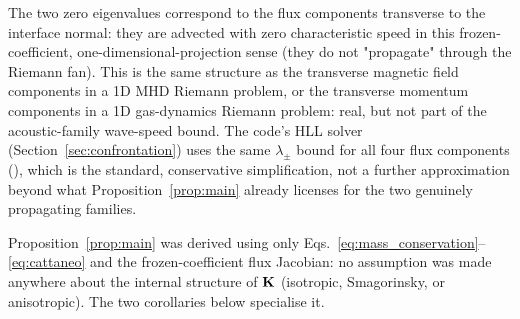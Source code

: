 \begin{remark}
The two zero eigenvalues correspond to the flux components transverse to
the interface normal: they are advected with zero characteristic speed in
this frozen-coefficient, one-dimensional-projection sense (they do not
"propagate" through the Riemann fan). This is the same structure as the
transverse magnetic field components in a 1D MHD Riemann problem, or the
transverse momentum components in a 1D gas-dynamics Riemann problem: real,
but not part of the acoustic-family wave-speed bound. The code's HLL
solver (Section~\ref{sec:confrontation}) uses the same $\lambda_\pm$ bound
for all four flux components (),
which is the standard, conservative simplification, not a further
approximation beyond what Proposition~\ref{prop:main} already licenses for
the two genuinely propagating families.
\end{remark}

Proposition~\ref{prop:main} was derived using only
Eqs.~\eqref{eq:mass_conservation}--\eqref{eq:cattaneo} and the
frozen-coefficient flux Jacobian: no assumption was made anywhere about
the internal structure of $\mathbf{K}$ (isotropic, Smagorinsky, or
anisotropic). The two corollaries below specialise it.

